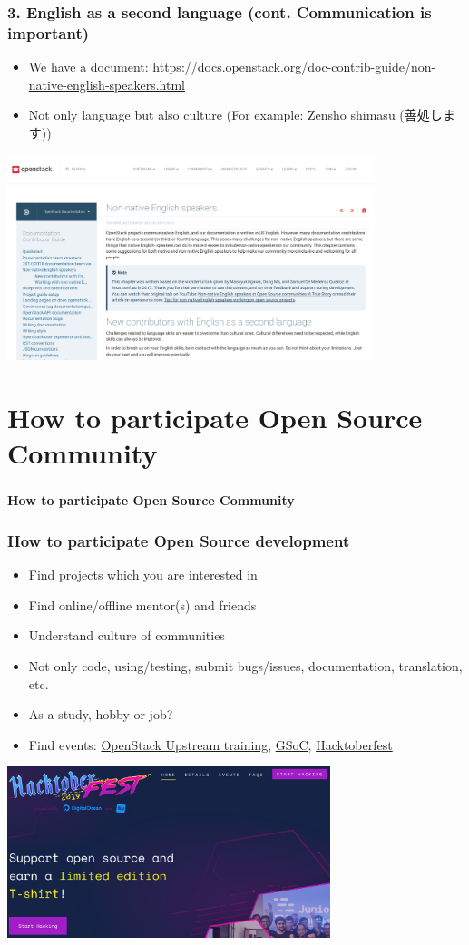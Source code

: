 \documentclass[aspectratio=169,11pt,hyperref={colorlinks=true}]{beamer}
\begin{document}
\begin{frame}
  \frametitle{3. English as a second language (cont. Communication is important)}
  \begin{itemize}
    \item We have a document: \url{https://docs.openstack.org/doc-contrib-guide/non-native-english-speakers.html}
    \item Not only language but also culture (For example: Zensho shimasu (善処します))
  \end{itemize}
  \centering\includegraphics[height=60mm]{images/non-native-english-speakers.png}
\end{frame}

\section{How to participate Open Source Community}
\begin{frame}
  \frametitle{ }
  \Huge{\bf{How to participate Open Source Community}}
\end{frame}

\begin{frame}
  \frametitle{How to participate Open Source development}
  \begin{itemize}
    \item Find projects which you are interested in
    \item Find online/offline mentor(s) and friends
    \item Understand culture of communities
    \item Not only code, using/testing, submit bugs/issues, documentation, translation, etc.
    \item As a study, hobby or job?
    \item Find events: \href{https://docs.openstack.org/upstream-training/\#upcoming-trainings}{OpenStack Upstream training},
     \href{https://summerofcode.withgoogle.com/}{GSoC},
     \href{https://hacktoberfest.digitalocean.com/}{Hacktoberfest}
  \end{itemize}
  \centering\includegraphics[height=50mm]{images/hacktoberfest.png}
\end{frame}
\end{document}
